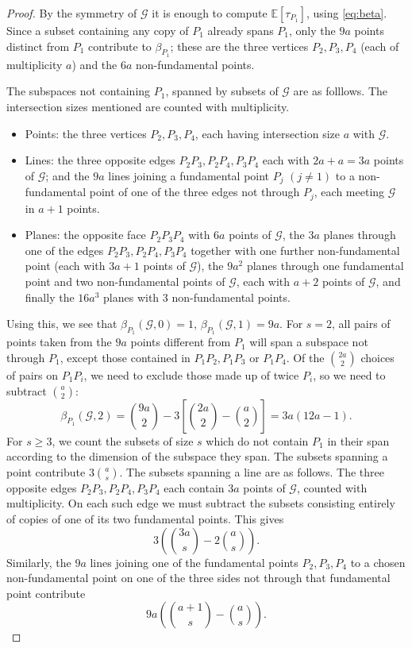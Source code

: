 \documentclass[10pt,a4paper]{amsart}
\newcommand{\E}{\mathbb{E}}
\newcommand{\Gscr}{\mathscr{G}}
\begin{document}
\begin{proof}
By the symmetry of $\Gscr$ it is enough to compute $\E[\tau_{P_1}]$, using \eqref{eq:beta}. Since a
subset containing any copy of $P_1$ already spans $P_1$, only the $9a$ points distinct from $P_1$
contribute to $\beta_{P_1}$; these are the three vertices $P_2,P_3,P_4$ (each of multiplicity $a$)
and the $6a$ non-fundamental points.

The subspaces not containing $P_1$, spanned by subsets of $\Gscr$ are as folllows. The intersection sizes mentioned are counted with multiplicity.

\begin{itemize}
    \item Points: the three vertices $P_2,P_3,P_4$, each having intersection size $a$ with $\Gscr.$
    \item Lines: the three opposite edges $P_2P_3,P_2P_4,P_3P_4$ each with $2a+a=3a$ points of $\Gscr$; and the $9a$ lines joining a fundamental point
    $P_j$ $(j\ne1)$ to a non-fundamental point of one of the three edges not through $P_j$, each meeting $\Gscr$ in $a+1$ points. 
    \item Planes: the opposite face $P_2P_3P_4$ with $6a$ points of $\Gscr$, the $3a$ planes through one of the edges $P_2P_3,P_2P_4,P_3P_4$ together with one further non-fundamental point (each with $3a+1$ points of $\Gscr$), the $9a^2$ planes through one fundamental point and two non-fundamental points of $\Gscr$, each with $a+2$ points of $\Gscr$, and finally the $16a^3$ planes with $3$ non-fundamental points.
\end{itemize}


Using this, we see that $\beta_{P_1}(\Gscr,0)=1$, $\beta_{P_1}(\Gscr,1)=9a$. For $s=2$, all pairs of points taken from the $9a$ points different from $P_1$ will span a subspace not through $P_1$, except those contained in $P_1P_2,P_1P_3$ or $P_1P_4$. Of the $\binom{2a}{2}$ choices of pairs on $P_1P_i$, we need to exclude those made up of twice $P_i$, so we need to subtract $\binom{a}{2}$:
\[
\beta_{P_1}(\Gscr,2)
=\binom{9a}{2}
-3\left[\binom{2a}{2}-\binom{a}{2}\right]
=3a(12a-1).
\]
For $s\geq 3$, we count the subsets of size $s$ which do not contain $P_1$
in their span according to the dimension of the subspace they span. The subsets spanning a point contribute $3\binom{a}{s}$.
The subsets spanning a line are as follows. The three opposite edges
$P_2P_3,P_2P_4,P_3P_4$ each contain $3a$ points of $\Gscr$, counted with
multiplicity. On each such edge we must subtract the subsets consisting
entirely of copies of one of its two fundamental points. This gives
\[
3\left(\binom{3a}{s}-2\binom{a}{s}\right).
\]
Similarly, the $9a$ lines joining one of the fundamental points
$P_2,P_3,P_4$ to a chosen non-fundamental point on one of the three sides
not through that fundamental point contribute
\[
9a\left(\binom{a+1}{s}-\binom{a}{s}\right).
\]


\end{proof}
\end{document}
